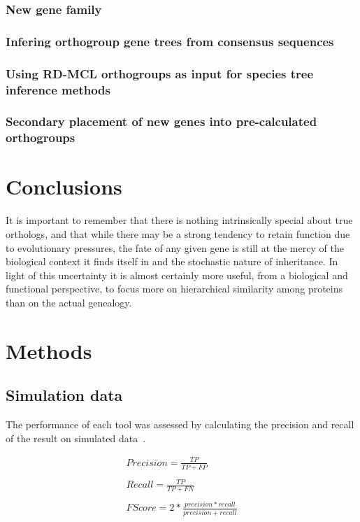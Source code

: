 \documentclass[twocolumn]{bmcart}%
\begin{document}
\subsubsection{New gene family}
\lipsum[2]

\subsubsection{Infering orthogroup gene trees from consensus sequences}
\lipsum[1]

\subsubsection{Using RD-MCL orthogroups as input for species tree inference methods}
\lipsum[1]

\subsubsection{Secondary placement of new genes into pre-calculated orthogroups}
\lipsum[1]

\section{Conclusions}\label{sec:conclusions}
It is important to remember that there is nothing intrinsically special about true orthologs, and that while there may be a strong tendency to retain function due to evolutionary pressures, the fate of any given gene is still at the mercy of the biological context it finds itself in and the stochastic nature of inheritance.
In light of this uncertainty it is almost certainly more useful, from a biological and functional perspective, to focus more on hierarchical similarity among proteins than on the actual genealogy.

\section{Methods}\label{sec:methods}
\subsection{Simulation data}\label{subsec:simulationData}
The performance of each tool was assessed by calculating the precision and recall of the result on simulated data~\cite{Emms:2015ig}.

\begin{gather*}
    Precision = \frac{TP}{TP + FP}\\
    \\
    Recall = \frac{TP}{TP + FN}\\
    \\
    F Score = 2 * \frac{precision * recall}{precision + recall}\\
\end{gather*}
\end{document}
